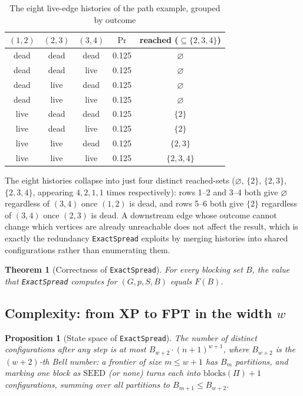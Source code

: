 \documentclass[11pt]{article}
\newtheorem{theorem}{Theorem}
\newtheorem{proposition}{Proposition}
\theoremstyle{definition}
\theoremstyle{remark}
\newcommand{\up}{\rule{0pt}{2.6ex}}
\newcommand{\down}{\rule[-1.2ex]{0pt}{0pt}}
\newcommand{\FF}{F}
\begin{document}
\begin{table}[h]
\centering
\caption{The eight live-edge histories of the path example, grouped by outcome\label{tab:twig-example}}
\begin{tabular}{@{}ccccc@{}}
\hline
\up $(1,2)$ & $(2,3)$ & $(3,4)$ & $\Pr$ & reached ($\subseteq\{2,3,4\}$) \\
\hline
\up dead & dead & dead & 0.125 & $\varnothing$ \\
dead & dead & live & 0.125 & $\varnothing$ \\
dead & live & dead & 0.125 & $\varnothing$ \\
dead & live & live & 0.125 & $\varnothing$ \\
live & dead & dead & 0.125 & $\{2\}$ \\
live & dead & live & 0.125 & $\{2\}$ \\
live & live & dead & 0.125 & $\{2,3\}$ \\
\down live & live & live & 0.125 & $\{2,3,4\}$ \\
\hline
\end{tabular}
{\footnotesize The eight histories collapse into just four distinct reached-sets
($\varnothing$, $\{2\}$, $\{2,3\}$, $\{2,3,4\}$, appearing $4,2,1,1$ times
respectively): rows 1--2 and 3--4 both give $\varnothing$ regardless of
$(3,4)$ once $(1,2)$ is dead, and rows 5--6 both give $\{2\}$ regardless of
$(3,4)$ once $(2,3)$ is dead. A downstream edge whose outcome cannot change
which vertices are already unreachable does not affect the result, which
is exactly the redundancy \texttt{ExactSpread} exploits by merging
histories into shared configurations rather than enumerating them.}
\end{table}

\begin{theorem}[Correctness of \texttt{ExactSpread}]\label{thm:twig-correct}
For every blocking set $B$, the value that \texttt{ExactSpread} computes for $(G,p,S,B)$ equals $\FF(B)$.
\end{theorem}

\subsection{Complexity: from XP to FPT in the width $w$}\label{sec:twig-complexity}

\begin{proposition}[State space of \texttt{ExactSpread}]\label{prop:xp-space}
The number of distinct configurations after any step is at most
$B_{w+2}\cdot(n+1)^{w+1}$, where $B_{w+2}$ is the $(w+2)$-th Bell number: a
frontier of size $m\le w+1$ has $B_m$ partitions, and marking one block as
$\mathrm{SEED}$ (or none) turns each into $\mathrm{blocks}(\Pi)+1$
configurations, summing over all partitions to $B_{m+1}\le B_{w+2}$.
\end{proposition}
\end{document}
